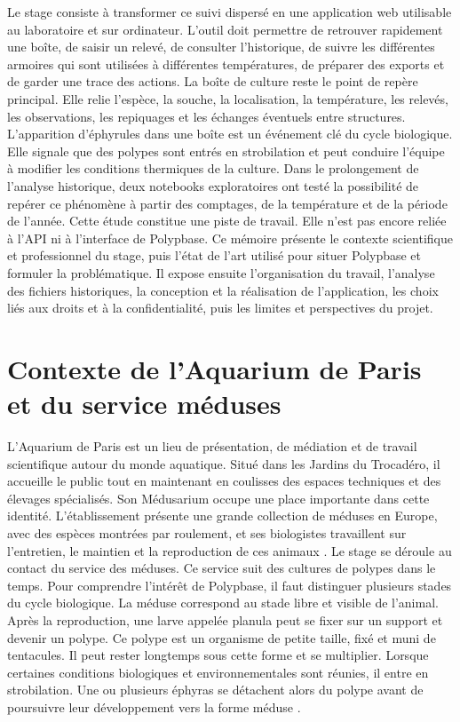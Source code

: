 \documentclass{article}
\let\oldsection\section
\renewcommand{\section}{\clearpage\oldsection}
\begin{document}
Le stage consiste à transformer ce suivi dispersé en une application web utilisable au laboratoire et sur ordinateur. L’outil doit permettre de retrouver rapidement une boîte, de saisir un relevé, de consulter l’historique, de suivre les différentes armoires qui sont utilisées à différentes températures, de préparer des exports et de garder une trace des actions. La boîte de culture reste le point de repère principal. Elle relie l’espèce, la souche, la localisation, la température, les relevés, les observations, les repiquages et les échanges éventuels entre structures.
L’apparition d’éphyrules dans une boîte est un événement clé du cycle biologique. Elle signale que des polypes sont entrés en strobilation et peut conduire l’équipe à modifier les conditions thermiques de la culture. Dans le prolongement de l’analyse historique, deux notebooks exploratoires ont testé la possibilité de repérer ce phénomène à partir des comptages, de la température et de la période de l’année. Cette étude constitue une piste de travail. Elle n’est pas encore reliée à l’API ni à l’interface de Polypbase.
Ce mémoire présente le contexte scientifique et professionnel du stage, puis l’état de l’art utilisé pour situer Polypbase et formuler la problématique. Il expose ensuite l’organisation du travail, l’analyse des fichiers historiques, la conception et la réalisation de l’application, les choix liés aux droits et à la confidentialité, puis les limites et perspectives du projet.


\section{Contexte de l’Aquarium de Paris et du service méduses}

L’Aquarium de Paris est un lieu de présentation, de médiation et de travail scientifique autour du monde aquatique. Situé dans les Jardins du Trocadéro, il accueille le public tout en maintenant en coulisses des espaces techniques et des élevages spécialisés. Son Médusarium occupe une place importante dans cette identité. L’établissement présente une grande collection de méduses en Europe, avec des espèces montrées par roulement, et ses biologistes travaillent sur l’entretien, le maintien et la reproduction de ces animaux \cite{aquarium-medusarium}.
Le stage se déroule au contact du service des méduses. Ce service suit des cultures de polypes dans le temps. Pour comprendre l’intérêt de Polypbase, il faut distinguer plusieurs stades du cycle biologique. La méduse correspond au stade libre et visible de l’animal. Après la reproduction, une larve appelée planula peut se fixer sur un support et devenir un polype. Ce polype est un organisme de petite taille, fixé et muni de tentacules. Il peut rester longtemps sous cette forme et se multiplier. Lorsque certaines conditions biologiques et environnementales sont réunies, il entre en strobilation. Une ou plusieurs éphyras se détachent alors du polype avant de poursuivre leur développement vers la forme méduse \cite{helm2018}.
\end{document}
